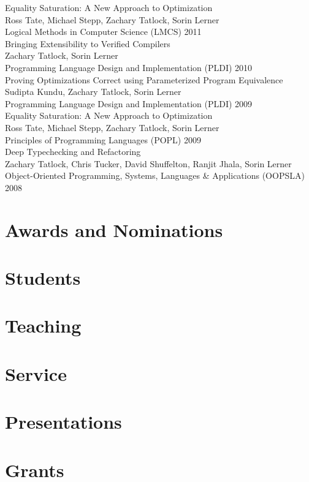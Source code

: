 \documentclass[10pt]{article}
\begin{document}
Equality Saturation: A New Approach to Optimization \\
Ross Tate, Michael Stepp, Zachary Tatlock, Sorin Lerner \\
Logical Methods in Computer Science (LMCS) 2011 \\

Bringing Extensibility to Verified Compilers \\
Zachary Tatlock, Sorin Lerner \\
Programming Language Design and Implementation (PLDI) 2010 \\

Proving Optimizations Correct using Parameterized Program Equivalence \\
Sudipta Kundu, Zachary Tatlock, Sorin Lerner \\
Programming Language Design and Implementation (PLDI) 2009 \\

Equality Saturation: A New Approach to Optimization \\
Ross Tate, Michael Stepp, Zachary Tatlock, Sorin Lerner \\
Principles of Programming Languages (POPL) 2009 \\

Deep Typechecking and Refactoring \\
Zachary Tatlock, Chris Tucker, David Shuffelton, Ranjit Jhala, Sorin Lerner \\
Object-Oriented Programming, Systems, Languages \& Applications (OOPSLA) 2008 \\

\section*{Awards and Nominations}

\section*{Students}

\section*{Teaching}

\section*{Service}

\section*{Presentations}

\section*{Grants}
\end{document}
